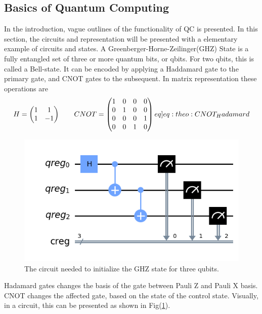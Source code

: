 \subsection{Basics of Quantum Computing}
In the introduction, vague outlines of the functionality of QC is presented. In this section, the circuits and representation will be presented with a elementary example of circuits and states. A Greenberger-Horne-Zeilinger(GHZ) State is a  fully entangled set of three or more quantum bits, or qbits. For two qbits, this is called a Bell-state. It can be encoded by applying a Haddamard gate to the primary gate, and CNOT gates to the subsequent. In matrix representation these operations are
\begin{equation}
    H = \begin{pmatrix}
    1 & 1 \\
    1 & -1 
    \end{pmatrix} \qquad 
    CNOT = \begin{pmatrix}
    1 & 0 & 0 & 0 \\
    0 & 1 & 0 & 0 \\
    0 & 0 & 0 & 1 \\
    0 & 0 & 1 & 0 
    \end{pmatrix} \label[eq]{eq:theo:CNOT_Hadamard}
\end{equation}
\begin{figure}
    \centering
    \includegraphics[width=\linewidth]{figs/GHZ.png}
    \caption{The circuit needed to initialize the GHZ state for three qubits.}
    \label{fig:GHZ_circ}
\end{figure}
Hadamard gates changes the basis of the gate between Pauli Z and Pauli X basis. CNOT changes the affected gate, based on the state of the control state. Visually, in a circuit, this can be presented as shown in Fig(\ref{fig:GHZ_circ}).
